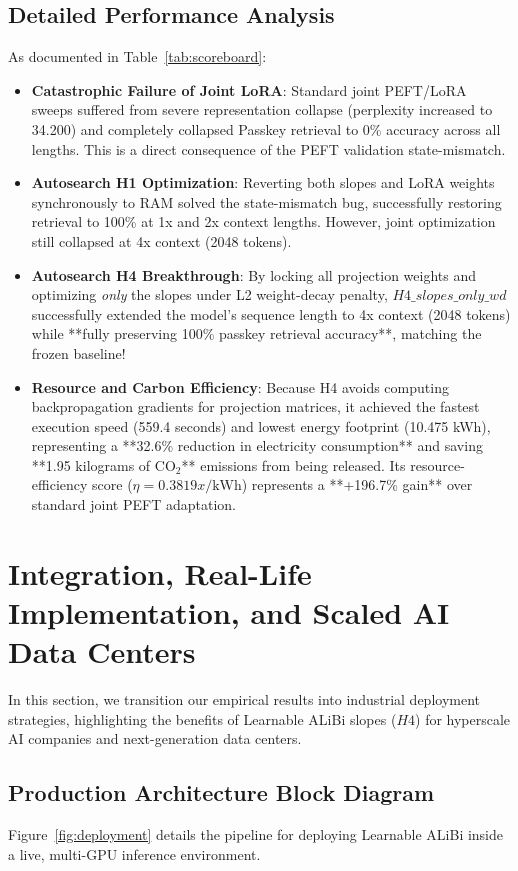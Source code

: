 \documentclass[11pt,journal,compsoc]{IEEEtran}
\begin{document}
\subsection{Detailed Performance Analysis}
As documented in Table~\ref{tab:scoreboard}:
\begin{itemize}
    \item \textbf{Catastrophic Failure of Joint LoRA}: Standard joint PEFT/LoRA sweeps suffered from severe representation collapse (perplexity increased to 34.200) and completely collapsed Passkey retrieval to 0\% accuracy across all lengths. This is a direct consequence of the PEFT validation state-mismatch.
    \item \textbf{Autosearch H1 Optimization}: Reverting both slopes and LoRA weights synchronously to RAM solved the state-mismatch bug, successfully restoring retrieval to 100\% at 1x and 2x context lengths. However, joint optimization still collapsed at 4x context (2048 tokens).
    \item \textbf{Autosearch H4 Breakthrough}: By locking all projection weights and optimizing \textit{only} the slopes under L2 weight-decay penalty, $H4\_slopes\_only\_wd$ successfully extended the model's sequence length to 4x context (2048 tokens) while **fully preserving 100\% passkey retrieval accuracy**, matching the frozen baseline!
    \item \textbf{Resource and Carbon Efficiency}: Because H4 avoids computing backpropagation gradients for projection matrices, it achieved the fastest execution speed (559.4 seconds) and lowest energy footprint (10.475 kWh), representing a **32.6\% reduction in electricity consumption** and saving **1.95 kilograms of CO${}_2$** emissions from being released. Its resource-efficiency score ($\eta = 0.3819x/\text{kWh}$) represents a **+196.7\% gain** over standard joint PEFT adaptation.
\end{itemize}

\section{Integration, Real-Life Implementation, and Scaled AI Data Centers}
\label{sec:integration}

In this section, we transition our empirical results into industrial deployment strategies, highlighting the benefits of Learnable ALiBi slopes ($H4$) for hyperscale AI companies and next-generation data centers.

\subsection{Production Architecture Block Diagram}
Figure~\ref{fig:deployment} details the pipeline for deploying Learnable ALiBi inside a live, multi-GPU inference environment.
\end{document}
